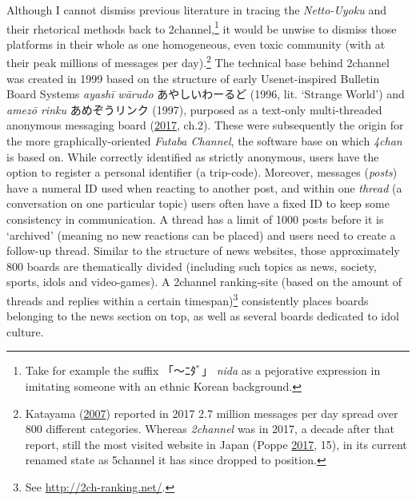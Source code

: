 \documentclass[10pt,british,A4paper,,openany]{memoir}
\begin{document}
Although I cannot dismiss previous literature in tracing the
\emph{Netto-Uyoku} and their rhetorical methods back to
2channel,\footnote{Take for example the suffix 「～ﾆﾀﾞ」 \emph{nida} as
  a pejorative expression in imitating someone with an ethnic Korean
  background.} it would be unwise to dismiss those platforms in their
whole as one homogeneous, even toxic community (with at their peak
millions of messages per day).\footnote{Katayama
  (\protect\hyperlink{ref-katayama_2-channel_2007}{2007}) reported in
  2017 2.7 million messages per day spread over 800 different
  categories. Whereas \emph{2channel} was in 2017, a decade after that
  report, still the  most visited website in Japan (Poppe
  \protect\hyperlink{ref-poppe_digitaal_2017}{2017}, 15), in its current
  renamed state as 5channel it has since dropped to  position.}
The technical base behind 2channel was created in 1999 based on the
structure of early Usenet-inspired Bulletin Board Systems \emph{ayashī
wārudo} あやしいわーるど (1996, lit. `Strange World') and \emph{amezō
rinku} あめぞうリンク (1997), purposed as a text-only multi-threaded
anonymous messaging board
(\protect\hyperlink{ref-barubora_eng:_2017}{2017}, ch.2). These were
subsequently the origin for the more graphically-oriented \emph{Futaba
Channel}, the software base on which \emph{4chan} is based on. While
correctly identified as strictly anonymous, users have the option to
register a personal identifier (a trip-code). Moreover, messages
(\emph{posts}) have a numeral ID used when reacting to another post, and
within one \emph{thread} (a conversation on one particular topic) users
often have a fixed ID to keep some consistency in communication. A
thread has a limit of 1000 posts before it is `archived' (meaning no new
reactions can be placed) and users need to create a follow-up thread.
Similar to the structure of news websites, those approximately 800
boards are thematically divided (including such topics as news, society,
sports, idols and video-games). A 2channel ranking-site (based on the
amount of threads and replies within a certain timespan)\footnote{See
  \url{http://2ch-ranking.net/}.} consistently places boards belonging
to the news section on top, as well as several boards dedicated to idol
culture.
\end{document}
